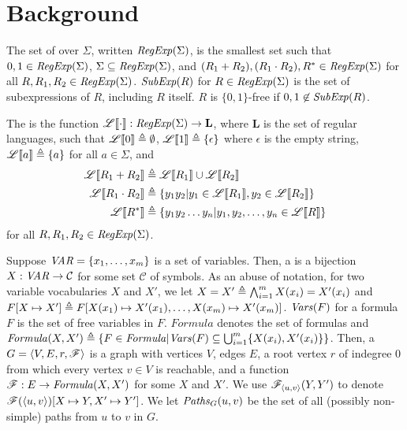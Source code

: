 \section{Background} \label{sec:background}

The set of  over $\Sigma$, written
$\mathit{RegExp}(\Sigma)$, is the smallest set such that
$0, 1 \in \mathit{RegExp}(\Sigma)$, $\Sigma \subseteq \mathit{RegExp}(\Sigma)$,
and $(R_1 + R_2), (R_1 \cdot R_2), R^* \in \mathit{RegExp}(\Sigma)$ for
all $R, R_1, R_2 \in \mathit{RegExp}(\Sigma)$. $\mathit{SubExp}(R)$ for
$R \in \mathit{RegExp}(\Sigma)$ is the set of subexpressions of $R$,
including $R$ itself. $R$ is $\{0,1\}$-free if
$0, 1 \not \in \mathit{SubExp}(R)$.

The  is the function
$\mathscr{L} \llbracket \cdot \rrbracket: \mathit{RegExp}(\Sigma) \to \textbf{L}$, where $\textbf{L}$
is the set of regular languages, such that
$\mathscr{L} \llbracket 0 \rrbracket \triangleq \emptyset$, $\mathscr{L} \llbracket 1 \rrbracket \triangleq \{\epsilon\}$ where
$\epsilon$ is the empty string, $\mathscr{L} \llbracket a \rrbracket \triangleq \{a\}$ for all
$a \in \Sigma$, and
\begin{align*}
  \mathscr{L} \llbracket R_1 + R_2 \rrbracket &\triangleq \mathscr{L} \llbracket R_1 \rrbracket \cup \mathscr{L} \llbracket R_2 \rrbracket \\
  \mathscr{L} \llbracket R_1 \cdot R_2 \rrbracket &\triangleq \{y_1y_2| y_1 \in \mathscr{L} \llbracket R_1 \rrbracket, y_2 \in
                       \mathscr{L} \llbracket R_2 \rrbracket\} \\
  \mathscr{L} \llbracket R^* \rrbracket &\triangleq \{y_1y_2\dots y_n| y_1,y_2,\dots,y_n \in \mathscr{L} \llbracket R \rrbracket\}
\end{align*}
for all $R, R_1, R_2 \in \mathit{RegExp}(\Sigma)$.

Suppose $\mathit{VAR} = \{x_1,\dots,x_m\}$ is a set of variables.  Then,
a  is a bijection
$X: \mathit{VAR} \to \mathcal{C}$ for some set $\mathcal{C}$ of
symbols. As an abuse of notation, for two variable vocabularies
$X$ and $X'$, we let
$X = X' \triangleq \bigwedge_{i=1}^m X(x_i) = X'(x_i)$ and
$F[X \mapsto X'] \triangleq F[X(x_1) \mapsto X'(x_1), \dots, X(x_m)
\mapsto X'(x_m)]$. $\mathit{Vars}(F)$ for a formula $F$ is the set of free
variables in $F$. $\mathit{Formula}$ denotes the set of formulas
and
$\mathit{Formula}(X, X') \triangleq \{F \in \mathit{Formula}|\mathit{Vars}(F) \subseteq
\bigcup_{i=1}^m \{X(x_i), X'(x_i)\}\}$. Then, a  $G = \langle V, E, r, \mathscr{F} \rangle$ is a graph with
vertices $V$, edges $E$, a root vertex $r$ of indegree 0 from
which every vertex $v \in V$ is reachable, and a function
$\mathscr{F}: E \to \mathit{Formula}(X, X')$ for some $X$ and $X'$. We
use $\mathscr{F}_{\langle u,v \rangle}(Y, Y')$ to denote
$\mathscr{F}(\langle u,v \rangle)[X \mapsto Y, X' \mapsto Y']$. We let
$\mathit{Paths}_{G}(u,v)$ be the set of all (possibly non-simple) paths
from $u$ to $v$ in $G$.

